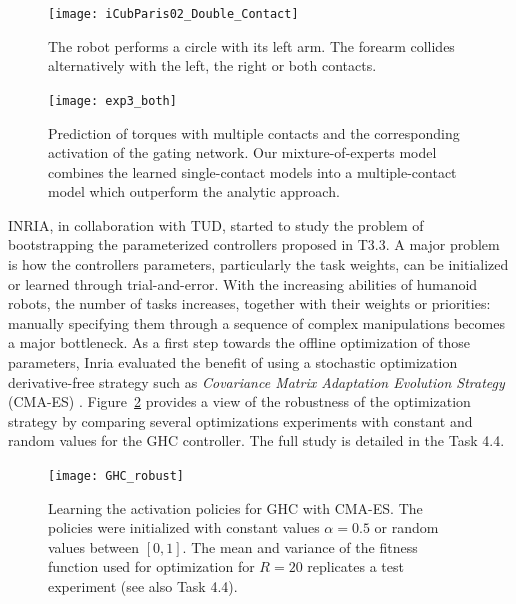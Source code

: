 	\begin{figure}[t]
		\begin{minipage}{.43\linewidth}
			\centering
			\texttt{[image: iCubParis02\_Double\_Contact]}
			\caption{The robot performs a circle with its left arm. 
			The forearm collides alternatively with the left, the right or both contacts.}
			\label{fig:exp3:icuparis_experiment_bars}
		\end{minipage}	
		\hfill
		\begin{minipage}{.52\linewidth}
			\centering
			\texttt{[image: exp3\_both]}
			\caption{Prediction of torques with multiple contacts and the corresponding activation of the gating network.
			Our mixture-of-experts model combines the learned single-contact models into a multiple-contact model which outperform the analytic approach.
			}
			\label{fig:exp3:gating}
		\end{minipage}	
	\end{figure}
	
INRIA, in collaboration with TUD, started to study the problem of bootstrapping the parameterized controllers proposed in T3.3. A major problem is how the controllers parameters, particularly the task weights, can be initialized or learned through trial-and-error. With the increasing abilities of humanoid robots, the number of tasks increases, together with their weights or priorities: manually specifying them through a sequence of complex manipulations becomes a major bottleneck. 
As a first step towards the offline optimization of those parameters, Inria evaluated the benefit of using a stochastic optimization derivative-free strategy such as \textit{Covariance Matrix Adaptation Evolution Strategy} (CMA-ES) \cite{Hansen-2001-ID362}. Figure~\ref{fig:robust} provides a view of the robustness of the optimization strategy by comparing several optimizations experiments with constant and random values for the GHC controller.
The full study is detailed in the Task 4.4.\\

\begin{figure}[h!]
  \centering
  \texttt{[image: GHC\_robust]}
\caption{Learning the activation policies for GHC with CMA-ES. The policies were initialized with constant values $\alpha=0.5$ or random values between $[0,1]$. The mean and variance of the fitness function used for optimization for $R=20$ replicates a test experiment (see also Task 4.4).}
\label{fig:robust}
\end{figure}

